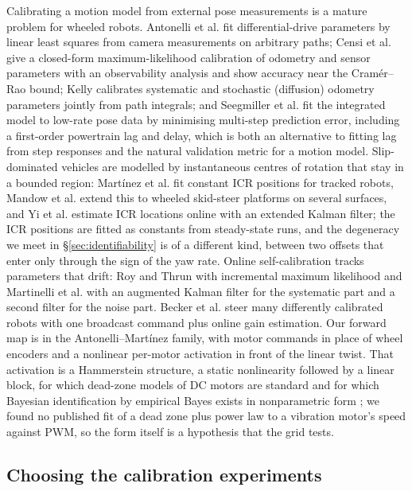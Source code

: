 Calibrating a motion model from external pose measurements is a mature
problem for wheeled robots. Antonelli et al.
\cite{antonelli2005odometry} fit differential-drive parameters by
linear least squares from camera measurements on arbitrary paths; Censi
et al. \cite{censi2013calibration} give a closed-form
maximum-likelihood calibration of odometry and sensor parameters with an
observability analysis and show accuracy near the Cramér--Rao bound;
Kelly \cite{kelly2004odometry} calibrates systematic and stochastic
(diffusion) odometry parameters jointly from path integrals; and
Seegmiller et al. \cite{seegmiller2013ipem} fit the integrated model to
low-rate pose data by minimising multi-step prediction error, including
a first-order powertrain lag and delay, which is both an alternative to
fitting lag from step responses and the natural validation metric for a
motion model. Slip-dominated vehicles are modelled by instantaneous
centres of rotation that stay in a bounded region: Martínez et al.
\cite{martinez2005icr} fit constant ICR positions for tracked robots,
Mandow et al. \cite{mandow2007skidsteer} extend this to wheeled
skid-steer platforms on several surfaces, and Yi et al.
\cite{yi2009skidsteer} estimate ICR locations online with an extended
Kalman filter; the ICR positions are fitted as constants from
steady-state runs, and the degeneracy we meet in
§\ref{sec:identifiability} is of a different kind, between two offsets
that enter only through the sign of the yaw rate. Online self-calibration tracks parameters that drift: Roy and
Thrun \cite{roy1999selfcalibration} with incremental maximum likelihood
and Martinelli et al. \cite{martinelli2007selfcalibration} with an
augmented Kalman filter for the systematic part and a second filter for
the noise part. Becker et al. \cite{becker2014massive} steer many
differently calibrated robots with one broadcast command plus online
gain estimation. Our forward map is in the Antonelli--Martínez family,
with motor commands in place of wheel encoders and a nonlinear per-motor
activation in front of the linear twist. That activation is a
Hammerstein structure, a static nonlinearity followed by a linear block,
for which dead-zone models of DC motors are standard
\cite{kara2004dcmotor, zhang2017deadzone} and for which Bayesian
identification by empirical Bayes exists in nonparametric form
\cite{risuleo2017hammerstein}; we found no published fit of a dead zone
plus power law to a vibration motor's speed against PWM, so the form
itself is a hypothesis that the grid tests.

\subsection{Choosing the calibration
experiments}

